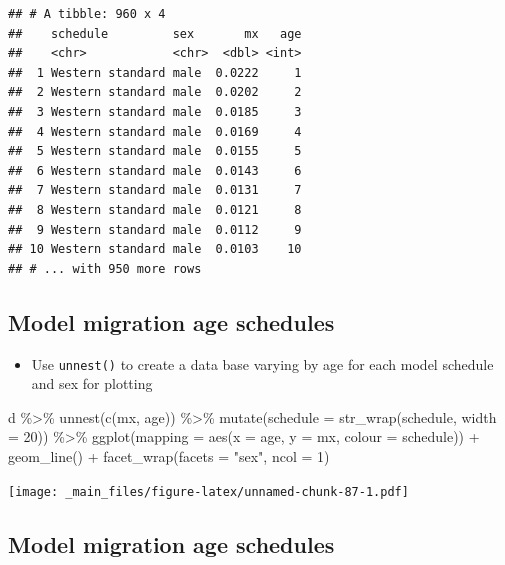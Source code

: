 \documentclass[
]{book}
\newenvironment{Shaded}{\begin{snugshade}}{\end{snugshade}}
\newcommand{\AttributeTok}[1]{\textcolor[rgb]{0.77,0.63,0.00}{#1}}
\newcommand{\DecValTok}[1]{\textcolor[rgb]{0.00,0.00,0.81}{#1}}
\newcommand{\FunctionTok}[1]{\textcolor[rgb]{0.00,0.00,0.00}{#1}}
\newcommand{\NormalTok}[1]{#1}
\newcommand{\SpecialCharTok}[1]{\textcolor[rgb]{0.00,0.00,0.00}{#1}}
\newcommand{\StringTok}[1]{\textcolor[rgb]{0.31,0.60,0.02}{#1}}
\providecommand{\tightlist}{%
  \setlength{\itemsep}{0pt}\setlength{\parskip}{0pt}}
\begin{document}
\begin{verbatim}
## # A tibble: 960 x 4
##    schedule         sex       mx   age
##    <chr>            <chr>  <dbl> <int>
##  1 Western standard male  0.0222     1
##  2 Western standard male  0.0202     2
##  3 Western standard male  0.0185     3
##  4 Western standard male  0.0169     4
##  5 Western standard male  0.0155     5
##  6 Western standard male  0.0143     6
##  7 Western standard male  0.0131     7
##  8 Western standard male  0.0121     8
##  9 Western standard male  0.0112     9
## 10 Western standard male  0.0103    10
## # ... with 950 more rows
\end{verbatim}

\hypertarget{model-migration-age-schedules-7}{%
\subsection{Model migration age schedules}\label{model-migration-age-schedules-7}}

\begin{itemize}
\tightlist
\item
  Use \texttt{unnest()} to create a data base varying by age for each model schedule and sex for plotting
\end{itemize}

\begin{Shaded}
\begin{Highlighting}[]
\NormalTok{d }\SpecialCharTok{\%\textgreater{}\%}
  \FunctionTok{unnest}\NormalTok{(}\FunctionTok{c}\NormalTok{(mx, age)) }\SpecialCharTok{\%\textgreater{}\%}
  \FunctionTok{mutate}\NormalTok{(}\AttributeTok{schedule =} \FunctionTok{str\_wrap}\NormalTok{(schedule, }\AttributeTok{width =} \DecValTok{20}\NormalTok{)) }\SpecialCharTok{\%\textgreater{}\%}
  \FunctionTok{ggplot}\NormalTok{(}\AttributeTok{mapping =} \FunctionTok{aes}\NormalTok{(}\AttributeTok{x =}\NormalTok{ age, }\AttributeTok{y =}\NormalTok{ mx, }\AttributeTok{colour =}\NormalTok{ schedule)) }\SpecialCharTok{+}
  \FunctionTok{geom\_line}\NormalTok{() }\SpecialCharTok{+}
  \FunctionTok{facet\_wrap}\NormalTok{(}\AttributeTok{facets =} \StringTok{"sex"}\NormalTok{, }\AttributeTok{ncol =} \DecValTok{1}\NormalTok{)}
\end{Highlighting}
\end{Shaded}

\texttt{[image: \_main\_files/figure-latex/unnamed-chunk-87-1.pdf]}

\hypertarget{model-migration-age-schedules-8}{%
\subsection{Model migration age schedules}\label{model-migration-age-schedules-8}}
\end{document}
